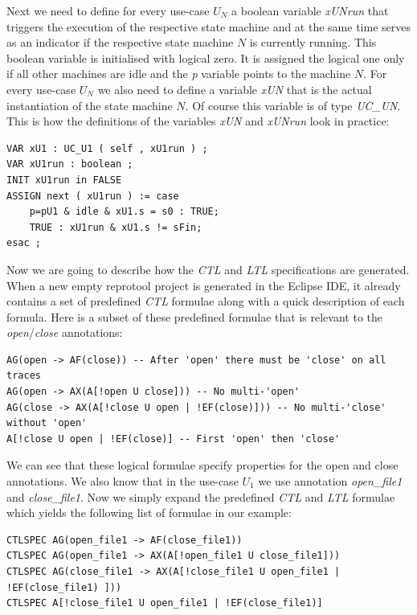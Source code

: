 Next we need to define for every use-case $U_N$ a boolean variable \emph{xUNrun} that triggers the execution of the respective state machine and at the same time serves as an indicator if the respective state machine $N$ is currently running.
This boolean variable is initialised with logical zero.
It is assigned the logical one only if all other machines are idle and the \emph{p} variable points to the machine $N$. For every use-case $U_N$ we also need to define a variable \emph{xUN} that is the actual instantiation of the state machine $N$.
Of course this variable is of type \emph{UC\_UN}.
This is how the definitions of the variables \emph{xUN} and \emph{xUNrun} look in practice:
\begin{lstlisting}
VAR xU1 : UC_U1 ( self , xU1run ) ;
VAR xU1run : boolean ;
INIT xU1run in FALSE
ASSIGN next ( xU1run ) := case
	p=pU1 & idle & xU1.s = s0 : TRUE;
	TRUE : xU1run & xU1.s != sFin;
esac ;
\end{lstlisting}

Now we are going to describe how the \emph{CTL} and \emph{LTL} specifications are generated.
When a new empty reprotool project is generated in the Eclipse \ac{IDE}, it already contains a set of predefined \emph{CTL} formulae along with a quick description of each formula.
Here is a subset of these predefined formulae that is relevant to the \emph{open}/\emph{close} annotations:

\begin{lstlisting}
AG(open -> AF(close)) -- After 'open' there must be 'close' on all traces
AG(open -> AX(A[!open U close])) -- No multi-'open'
AG(close -> AX(A[!close U open | !EF(close)])) -- No multi-'close' without 'open'
A[!close U open | !EF(close)] -- First 'open' then 'close'
\end{lstlisting}

We can see that these logical formulae specify properties for the open and close annotations.
We also know that in the use-case $U_1$ we use annotation \emph{open\_file1} and \emph{close\_file1}.
Now we simply expand the predefined \emph{CTL} and \emph{LTL} formulae which yields the following list of formulae in our example:
\begin{lstlisting}
CTLSPEC AG(open_file1 -> AF(close_file1))
CTLSPEC AG(open_file1 -> AX(A[!open_file1 U close_file1]))
CTLSPEC AG(close_file1 -> AX(A[!close_file1 U open_file1 | !EF(close_file1) ]))
CTLSPEC A[!close_file1 U open_file1 | !EF(close_file1)]
\end{lstlisting}

